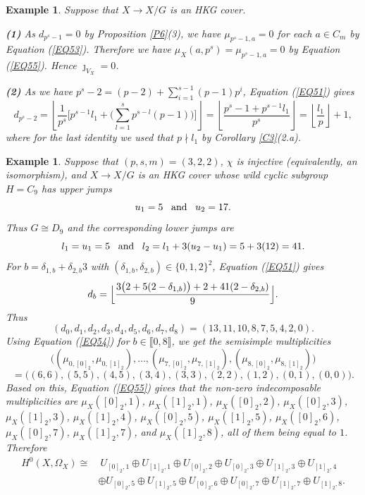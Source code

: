 \documentclass[11pt]{amsart}
\newtheorem{ex}[theorem]{Example}
\begin{document}
\begin{ex}\normalfont\label{EX8}
Suppose that $X\rightarrow X/G$ is an HKG cover. 

\medskip
{\bf (1)} As $d_{p^s-1}=0$ by Proposition \ref{P6}(3), we have $\mu_{p^s-1,a}=0$ for each $a\in C_m$ by Equation (\ref{EQ53}). Therefore we have $\mu_X(a,p^s)=\mu_{p^s-1,a}=0$ by Equation (\ref{EQ55}). Hence $\jmath_{V_X}=0$.

\smallskip
{\bf (2)} As we have $p^s-2=(p-2)+\sum_{i=1}^{s-1} (p-1)p^i$, Equation (\ref{EQ51}) gives
\[
d_{p^s-2}
=
\left\lfloor \frac{1}{p^s}\Big[p^{s-1}l_1+\Big(\sum_{l=1}^s p^{s-l}(p-1)\Big)\Big]\right\rfloor
=
\left\lfloor \frac{p^s-1+p^{s-1}l_1}{p^s}\right\rfloor
=\left\lfloor \frac{l_1}{p}\right\rfloor+1,
\]
where for the last identity we used that $p\nmid l_1$ by Corollary \ref{C3}(2.a). 
\end{ex}

\begin{ex}\normalfont\label{EX9}
Suppose that $(p,s,m)=(3,2,2)$, $\chi$ is injective (equivalently, an isomorphism), and $X\rightarrow X/G$ is an HKG cover whose wild cyclic subgroup $H=C_9$ has upper jumps
$$u_1=5\;\;\;\textup{and}\;\;\;u_2=17.$$
Thus $G\cong D_9$ and the corresponding lower jumps are
$$l_1=u_1=5\;\;\;\textup{and}\;\;\;l_2=l_1+3(u_2-u_1)=5+3(12)=41.$$
For $b=\delta_{1,b}+\delta_{2,b}3$ with $(\delta_{1,b},\delta_{2,b})\in\{0,1,2\}^2$, Equation (\ref{EQ51}) gives
$$d_b=\Bigl\lfloor \frac{3\bigl(2+5(2-\delta_{1,b})\bigr)+2+41(2-\delta_{2,b})}{9}\Bigr\rfloor.$$
Thus
$$(d_0,d_1,d_2,d_3,d_4,d_5,d_6,d_7,d_8)=(13,11,10,8,7,5,4,2,0).$$
Using Equation (\ref{EQ54}) for $b\in\llbracket0,8\rrbracket$, we get the semisimple multiplicities
$$\bigl((\mu_{0,[0]_2},\mu_{0,[1]_2}),\ldots,(\mu_{7,[0]_2},\mu_{7,[1]_2}),(\mu_{8,[0]_2},\mu_{8,[1]_2})\bigr)$$
$$=\bigl((6,6),(5,5),(4,5),(3,4),(3,3),(2,2),(1,2),(0,1),(0,0)\bigr).$$
Based on this, Equation (\ref{EQ55}) gives that the non-zero indecomposable multiplicities are $\mu_X([0]_2,1)$, $\mu_X([1]_2,1)$, $\mu_X([0]_2,2)$, $\mu_X([0]_2,3)$, $\mu_X([1]_2,3)$, $\mu_X([1]_2,4)$, $\mu_X([0]_2,5)$, $\mu_X([1]_2,5)$, $\mu_X([0]_2,6)$,
$\mu_X([0]_2,7)$, $\mu_X([1]_2,7)$, and $\mu_X([1]_2,8)$, all of them being equal to $1$. Therefore
\begin{align*}
H^0(X,\Omega_X)\cong &\ U_{[0]_2,1}\oplus U_{[1]_2,1}\oplus U_{[0]_2,2}\oplus U_{[0]_2,3}\oplus U_{[1]_2,3}\oplus U_{[1]_2,4}\\
&\oplus U_{[0]_2,5}\oplus U_{[1]_2,5}\oplus U_{[0]_2,6}\oplus U_{[0]_2,7}\oplus U_{[1]_2,7}\oplus U_{[1]_2,8}.
\end{align*}
\end{ex}
\end{document}
